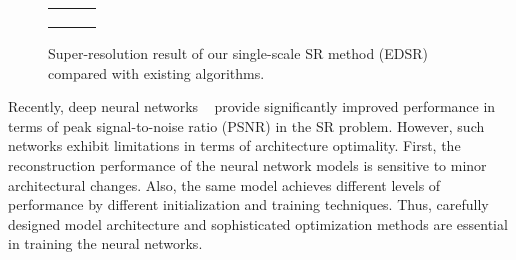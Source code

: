 \documentclass[10pt,twocolumn,letterpaper]{article}
\begin{document}
	\begin{figure}[t]
		\captionsetup[subfloat]{labelformat=empty}
		\begin{center}
			\newcommand{\rowArg}{2.65cm}
			\newcommand{\fullSize}{6.05cm}
			\newcommand{\patchSize}{2.6cm}
\setlength\tabcolsep{0.05cm}
			\begin{tabular}[b]{c c c}
				\multicolumn{2}{c}{\multirow{2}{*}[\rowArg]{
						\subfloat[0853 from DIV2K~\cite{Timofte_2017_CVPR_Workshops}]
{\includegraphics[height=\fullSize, trim={0.7cm 0 0.7cm 0}, clip]
							{figs/val_0853_Full_cut.png}}}} &
				\subfloat[HR  \protect\linebreak(PSNR / SSIM)]{
					\includegraphics[width = \patchSize, height = \patchSize]
					{figs/val_0853_GT.png}} \\ [-0.3cm]& &
				\subfloat[Bicubic  \protect\linebreak(30.80 dB / 0.9537)]{
					\includegraphics[width = \patchSize, height = \patchSize]
					{figs/val_0853_Bicubic.png}} \\ [-0.3cm]
				
				\subfloat[VDSR \cite{kim2016accurate}  \protect\linebreak(32.82 dB / 0.9623)]{
					\includegraphics[width = \patchSize, height = \patchSize]
					{figs/val_0853_VDSR.png}} &
				\subfloat[SRResNet \cite{ledig2016photo}  \protect\linebreak(34.00 dB / 0.9679)]{
					\includegraphics[width = \patchSize, height = \patchSize]
					{figs/val_0853_SRResNet_reproduce.png}}	&
				\subfloat[\textbf{EDSR+} (Ours)  \protect\linebreak(\textcolor{red}{34.78 dB} / \textcolor{red}{0.9708})]{
					\includegraphics[width = \patchSize, height = \patchSize]
					{figs/val_0853_Ours_Single.png}}		
			\end{tabular}		
\end{center}
		\setlength{\abovecaptionskip}{0cm}
		\captionsetup{justification=raggedright,singlelinecheck=false}
		\caption{ Super-resolution result of our single-scale SR method (EDSR) compared with existing algorithms.}
		
	\end{figure}
	
	Recently, deep neural networks ~\cite{kim2016accurate,kim2016deeply, ledig2016photo} provide significantly improved performance in terms of peak signal-to-noise ratio (PSNR) in the SR problem. 
	However, such networks exhibit limitations in terms of architecture optimality. 
	First, the reconstruction performance of the neural network models is sensitive to minor architectural changes. 
	Also, the same model achieves different levels of performance by different initialization and training techniques. 
	Thus, carefully designed model architecture and sophisticated optimization methods are essential in training the neural networks.
	
\end{document}
